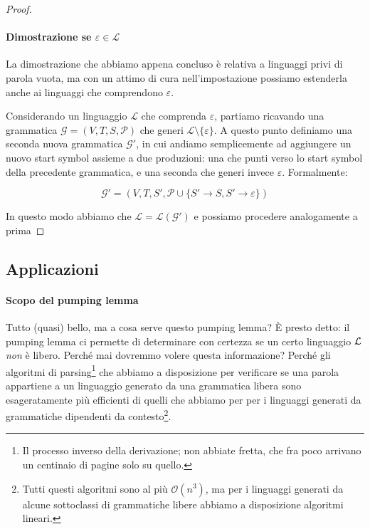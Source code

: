\documentclass[class=book, crop=false, oneside, 12pt]{standalone}
\begin{document}
\begin{proof}
   \paragraph{Dimostrazione se \(\varepsilon \in \mathcal{L}\)}
   La dimostrazione che abbiamo appena concluso è relativa a linguaggi privi di parola vuota, ma con un attimo di cura nell'impostazione possiamo estenderla anche ai linguaggi che comprendono \(\varepsilon\).

   Considerando un linguaggio \(\mathcal{L}\) che comprenda \(\varepsilon\), partiamo ricavando una grammatica \(\mathcal{G} = (V, T, S, \mathcal{P})\) che generi \(\mathcal{L} \setminus \{\varepsilon\}\). A questo punto definiamo una seconda nuova grammatica \(\mathcal{G}'\), in cui andiamo semplicemente ad aggiungere un nuovo start symbol assieme a due produzioni: una che punti verso lo start symbol della precedente grammatica, e una seconda che generi invece \(\varepsilon\). Formalmente:

   \begin{equation*}
     \mathcal{G}' = (V, T, S', \mathcal{P} \cup \{ S' \rightarrow S, S' \rightarrow \varepsilon \})
   \end{equation*}

   In questo modo abbiamo che \(\mathcal{L} = \mathcal{L(G')}\) e possiamo procedere analogamente a prima

\end{proof}

\subsection{Applicazioni}
  \paragraph{Scopo del pumping lemma}
  Tutto (quasi) bello, ma a cosa serve questo pumping lemma? È presto detto: il pumping lemma ci permette di determinare con certezza se un certo linguaggio \(\mathcal{L}\) \emph{non} è libero. Perché mai dovremmo volere questa informazione? Perché gli algoritmi di parsing\footnote{Il processo inverso della derivazione; non abbiate fretta, che fra poco arrivano un centinaio di pagine solo su quello.} che abbiamo a disposizione per verificare se una parola appartiene a un linguaggio generato da una grammatica libera sono esageratamente più efficienti di quelli che abbiamo per per i linguaggi generati da grammatiche dipendenti da contesto\footnote{Tutti questi algoritmi sono al più \(\mathcal{O}(n^3)\), ma per i linguaggi generati da alcune sottoclassi di grammatiche libere abbiamo a disposizione algoritmi lineari.}.
\end{document}
